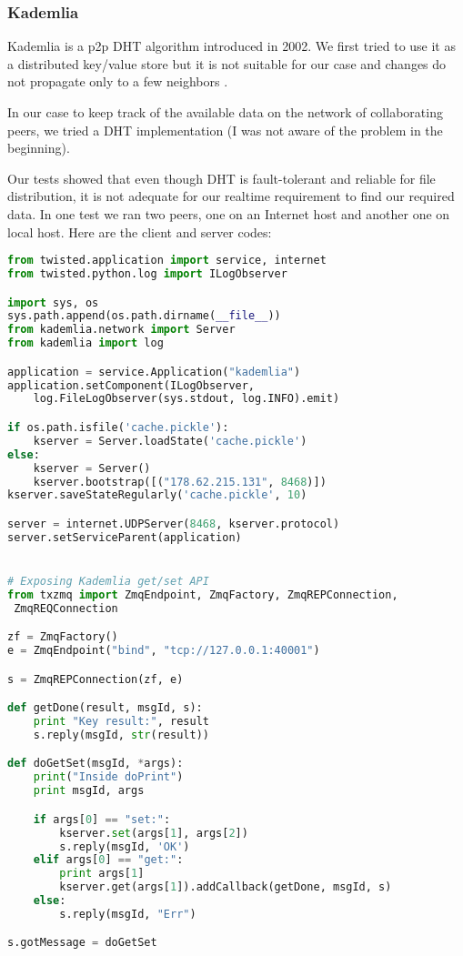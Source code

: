 \subsubsection{Kademlia}
Kademlia is a p2p DHT algorithm introduced in 2002. We first tried to use it as a distributed key/value store but 
it is not suitable for our case and changes do not propagate only to a few neighbors \cite{KademliaPaper}.

In our case to keep track of the available data on the network of collaborating peers, we tried a DHT implementation 
(I was not aware of the problem in the beginning).

Our tests showed that even though DHT is fault-tolerant and reliable for file distribution,
it is not adequate for our realtime requirement to find our required data. In one test we ran two peers,
one on an Internet host and another one on local host. Here are the client and server codes:

\begin{lstlisting}[language=python, caption={A twisted application to run Kademlia DHT}]
from twisted.application import service, internet
from twisted.python.log import ILogObserver

import sys, os
sys.path.append(os.path.dirname(__file__))
from kademlia.network import Server
from kademlia import log

application = service.Application("kademlia")
application.setComponent(ILogObserver, 
	log.FileLogObserver(sys.stdout, log.INFO).emit)

if os.path.isfile('cache.pickle'):
    kserver = Server.loadState('cache.pickle')
else:
    kserver = Server()
    kserver.bootstrap([("178.62.215.131", 8468)])
kserver.saveStateRegularly('cache.pickle', 10)

server = internet.UDPServer(8468, kserver.protocol)
server.setServiceParent(application)


# Exposing Kademlia get/set API
from txzmq import ZmqEndpoint, ZmqFactory, ZmqREPConnection,
 ZmqREQConnection

zf = ZmqFactory()
e = ZmqEndpoint("bind", "tcp://127.0.0.1:40001")

s = ZmqREPConnection(zf, e)

def getDone(result, msgId, s):
    print "Key result:", result
    s.reply(msgId, str(result))

def doGetSet(msgId, *args):
    print("Inside doPrint")
    print msgId, args

    if args[0] == "set:":
        kserver.set(args[1], args[2])
        s.reply(msgId, 'OK')
    elif args[0] == "get:":
        print args[1]
        kserver.get(args[1]).addCallback(getDone, msgId, s)
    else:
        s.reply(msgId, "Err")

s.gotMessage = doGetSet
\end{lstlisting}

